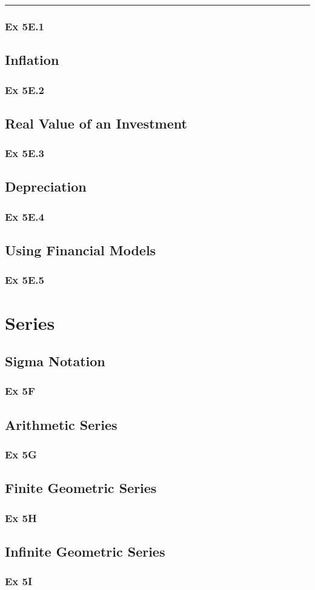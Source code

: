 \documentclass[12pt]{article}
\begin{document}
\vspace{0.5cm}\hrule
\subsubsection{Ex 5E.1}
\subsection{Inflation}
\subsubsection{Ex 5E.2}
\subsection{Real Value of an Investment}
\subsubsection{Ex 5E.3}
\subsection{Depreciation}
\subsubsection{Ex 5E.4}
\subsection{Using Financial Models}
\subsubsection{Ex 5E.5}
\section{Series}
\subsection{Sigma Notation}
\subsubsection{Ex 5F}
\subsection{Arithmetic Series}
\subsubsection{Ex 5G}
\subsection{Finite Geometric Series}
\subsubsection{Ex 5H}
\subsection{Infinite Geometric Series}
\subsubsection{Ex 5I}
\end{document}
